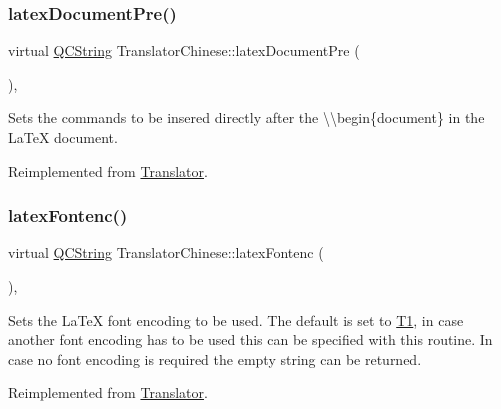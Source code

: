 \subsubsection{\texorpdfstring{latexDocumentPre()}{latexDocumentPre()}}
{\footnotesize\ttfamily virtual \mbox{\hyperlink{class_q_c_string}{Q\+C\+String}} Translator\+Chinese\+::latex\+Document\+Pre (\begin{DoxyParamCaption}{ }\end{DoxyParamCaption})\hspace{0.3cm}{\ttfamily [inline]}, {\ttfamily [virtual]}}

Sets the commands to be insered directly after the {\ttfamily \textbackslash{}\textbackslash{}begin\{document\}} in the La\+TeX document. 

Reimplemented from \mbox{\hyperlink{class_translator_a9fe33a516bc0ec6825a967294dd5d686}{Translator}}.

\mbox{\label{class_translator_chinese_a175c453b04357c5b3646e92137783345}} 
\subsubsection{\texorpdfstring{latexFontenc()}{latexFontenc()}}
{\footnotesize\ttfamily virtual \mbox{\hyperlink{class_q_c_string}{Q\+C\+String}} Translator\+Chinese\+::latex\+Fontenc (\begin{DoxyParamCaption}{ }\end{DoxyParamCaption})\hspace{0.3cm}{\ttfamily [inline]}, {\ttfamily [virtual]}}

Sets the La\+TeX font encoding to be used. The default is set to {\ttfamily \mbox{\hyperlink{class_t1}{T1}}}, in case another font encoding has to be used this can be specified with this routine. In case no font encoding is required the empty string can be returned. 

Reimplemented from \mbox{\hyperlink{class_translator_a573b483369d8d7cf7d85831a9da356be}{Translator}}.

\mbox{\label{class_translator_chinese_a561c2a69223ffe8042cc1196b32d65c5}} 
